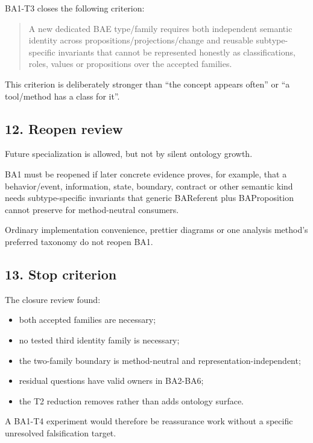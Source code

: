\documentclass[
  10pt,
  a4paper,
]{article}
\providecommand{\tightlist}{%
  \setlength{\itemsep}{0pt}\setlength{\parskip}{0pt}}
\begin{document}
BA1-T3 closes the following criterion:

\begin{quote}
A new dedicated BAE type/family requires both independent semantic
identity across propositions/projections/change and reusable
subtype-specific invariants that cannot be represented honestly as
classifications, roles, values or propositions over the accepted
families.
\end{quote}

This criterion is deliberately stronger than ``the concept appears
often'' or ``a tool/method has a class for it''.

\subsection{12. Reopen review}\label{reopen-review}

Future specialization is allowed, but not by silent ontology growth.

BA1 must be reopened if later concrete evidence proves, for example,
that a behavior/event, information, state, boundary, contract or other
semantic kind needs subtype-specific invariants that generic BAReferent
plus BAProposition cannot preserve for method-neutral consumers.

Ordinary implementation convenience, prettier diagrams or one analysis
method's preferred taxonomy do not reopen BA1.

\subsection{13. Stop criterion}\label{stop-criterion}

The closure review found:

\begin{itemize}
\tightlist
\item
  both accepted families are necessary;
\item
  no tested third identity family is necessary;
\item
  the two-family boundary is method-neutral and
  representation-independent;
\item
  residual questions have valid owners in BA2-BA6;
\item
  the T2 reduction removes rather than adds ontology surface.
\end{itemize}

A BA1-T4 experiment would therefore be reassurance work without a
specific unresolved falsification target.
\end{document}
